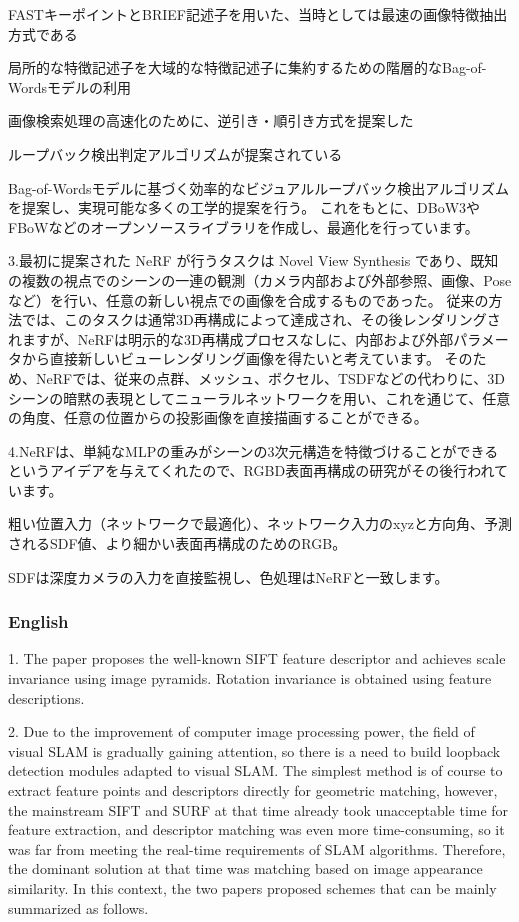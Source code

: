\documentclass[lang=cn,11pt,a4paper]{elegantpaper}
\begin{document}
FASTキーポイントとBRIEF記述子を用いた、当時としては最速の画像特徴抽出方式である

局所的な特徴記述子を大域的な特徴記述子に集約するための階層的なBag-of-Wordsモデルの利用

画像検索処理の高速化のために、逆引き・順引き方式を提案した

ループバック検出判定アルゴリズムが提案されている 

Bag-of-Wordsモデルに基づく効率的なビジュアルループバック検出アルゴリズムを提案し、実現可能な多くの工学的提案を行う。 これをもとに、DBoW3やFBoWなどのオープンソースライブラリを作成し、最適化を行っています。

3.最初に提案された NeRF が行うタスクは Novel View Synthesis であり、既知の複数の視点でのシーンの一連の観測（カメラ内部および外部参照、画像、Pose など）を行い、任意の新しい視点での画像を合成するものであった。 従来の方法では、このタスクは通常3D再構成によって達成され、その後レンダリングされますが、NeRFは明示的な3D再構成プロセスなしに、内部および外部パラメータから直接新しいビューレンダリング画像を得たいと考えています。 そのため、NeRFでは、従来の点群、メッシュ、ボクセル、TSDFなどの代わりに、3Dシーンの暗黙の表現としてニューラルネットワークを用い、これを通じて、任意の角度、任意の位置からの投影画像を直接描画することができる。

4.NeRFは、単純なMLPの重みがシーンの3次元構造を特徴づけることができるというアイデアを与えてくれたので、RGBD表面再構成の研究がその後行われています。

粗い位置入力（ネットワークで最適化）、ネットワーク入力のxyzと方向角、予測されるSDF値、より細かい表面再構成のためのRGB。

SDFは深度カメラの入力を直接監視し、色処理はNeRFと一致します。

\subsubsection{English}
1. The paper proposes the well-known SIFT feature descriptor and achieves scale invariance using image pyramids. Rotation invariance is obtained using feature descriptions.

2. Due to the improvement of computer image processing power, the field of visual SLAM is gradually gaining attention, so there is a need to build loopback detection modules adapted to visual SLAM. The simplest method is of course to extract feature points and descriptors directly for geometric matching, however, the mainstream SIFT and SURF at that time already took unacceptable time for feature extraction, and descriptor matching was even more time-consuming, so it was far from meeting the real-time requirements of SLAM algorithms. Therefore, the dominant solution at that time was matching based on image appearance similarity. In this context, the two papers proposed schemes that can be mainly summarized as follows.
\end{document}
